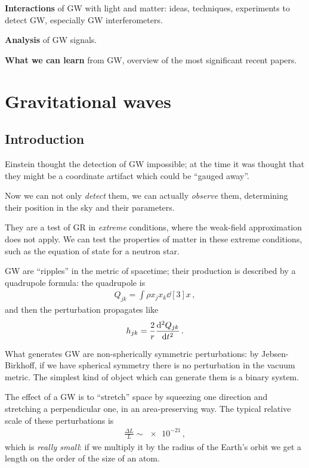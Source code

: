 \documentclass[main.tex]{subfiles}
\begin{document}
\textbf{Interactions} of GW with light and matter: ideas, techniques, experiments to detect GW, especially GW interferometers.

\textbf{Analysis} of GW signals. 

\textbf{What we can learn} from GW, overview of the most significant recent papers. 

\chapter{Gravitational waves}

\section{Introduction}


Einstein thought the detection of GW impossible; at the time it was thought that they might be a coordinate artifact which could be ``gauged away''.

Now we can not only \emph{detect} them, we can actually \emph{observe} them, determining their position in the sky and their parameters.

They are a test of GR in \emph{extreme} conditions, where the weak-field approximation does not apply.
We can test the properties of matter in these extreme conditions, such as the equation of state for a neutron star.

GW are ``ripples'' in the metric of spacetime; their production is described by a quadrupole formula: the quadrupole is 
%
\begin{align}
Q_{jk} = \int \rho x_{j} x_{k} \dd[3]{x}
\,,
\end{align}
%
and then the perturbation propagates like 
%
\begin{align}
h_{jk} = \frac{2}{r} \dv[2]{Q_{jk}}{t}
\,.
\end{align}

What generates GW are non-spherically symmetric perturbations: by Jebsen-Birkhoff, if we have spherical symmetry there is no perturbation in the vacuum metric.
The simplest kind of object which can generate them is a binary system.

The effect of a GW is to  ``stretch'' space by squeezing one direction and stretching a perpendicular one, in an area-preserving way.
The typical relative scale of these perturbations is 
%
\begin{align}
\frac{\Delta L}{L} \sim \num{e-21}
\,,
\end{align}
%
which is \emph{really small}: if we multiply it by the radius of the Earth's orbit we get a length on the order of the size of an atom.
\end{document}
